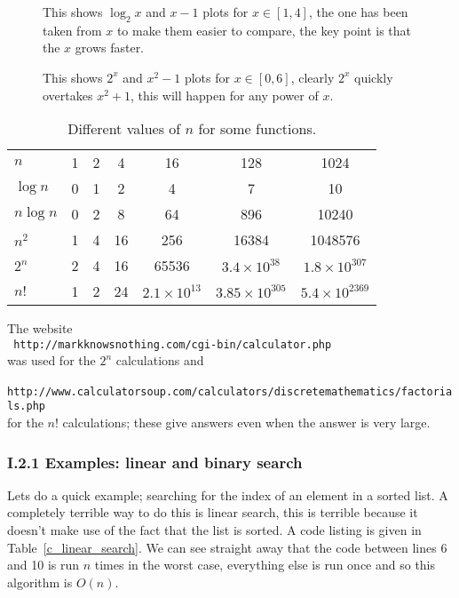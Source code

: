 \documentclass[11pt,a4paper]{scrartcl}
\begin{document}
\begin{figure}

\caption{This shows $\log_2{x}$ and $x-1$ plots for $x\in[1,4]$, the one has been taken from $x$ to make them easier to compare, the key point is that the $x$ grows faster.\label{fig_log}}
\end{figure}


\begin{figure}

\caption{This shows $2^x$ and $x^2-1$ plots for $x\in[0,6]$, clearly $2^x$ quickly overtakes $x^2+1$, this will happen for any power of $x$. \label{fig_log}}
\end{figure}

\begin{table}
\begin{tabular}{l|cccccc}
        $n$    &1   &2&4   &16  &128&1024\\
$\log{n}$      &0   &1&2   &4   &7  &10\\
$n\log{n}$     &0   &2&8   &64  &896&10240\\
$n^2$     &1   &4&16&256&16384&1048576\\
$2^n$     &2   &4&16&65536&$3.4\times 10^{38}$&$1.8\times 10^{307}$\\
$n!$      &1   &2&24&$2.1\times 10^{13}$&$3.85\times 10^{305}$&$5.4\times10^{2369}$
\end{tabular}
\vskip 1cm The website\\ {\tt
  http://markknowsnothing.com/cgi-bin/calculator.php}\\ was used for
the $2^n$ calculations and\\ {\tt
  http://www.calculatorsoup.com/calculators/discretemathematics/factorials.php}\\ for
the $n!$ calculations; these give answers even when the answer is very
large.

\caption{Different values of $n$ for some functions.  \label{table_n_values}
}
\end{table}

\subsubsection*{I.2.1 Examples: linear and binary search}

Lets do a quick example; searching for the index of an element in a
sorted list. A completely terrible way to do this is linear search,
this is terrible because it doesn't make use of the fact that the list
is sorted. A code listing is given in Table~\ref{c_linear_search}. We
can see straight away that the code between lines 6 and 10 is run $n$
times in the worst case, everything else is run once and so this
algorithm is $O(n)$.
\end{document}
